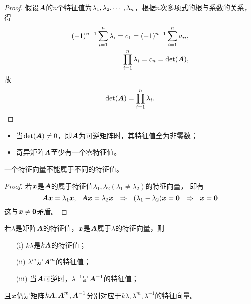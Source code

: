 \begin{frame}
\begin{proof}
  假设$\boldsymbol{A}$的$n$个特征值为$\lambda_1,\lambda_2,\cdots,\lambda_n$，根据$n$次多项式的根与系数的关系，得
  $$
  \begin{aligned}
    (-1)^{n-1}\sum_{i=1}^n\lambda_i = c_1 = (-1)^{n-1}\sum_{i=1}^na_{ii},\\
    \prod_{i=1}^n\lambda_i=c_n=\mathrm{det}(\boldsymbol{A}),
  \end{aligned}
  $$
  故
  $$
  \mathrm{det}(\boldsymbol{A})=\prod_{i=1}^n\lambda_i.
  $$
  
\end{proof}

\end{frame}

\begin{frame}[fragile]\ft{\subsecname}  

\begin{zhu*}
\begin{itemize}
\item 当$\mathrm{det}(\boldsymbol{A})\ne 0$，即$\boldsymbol{A}$为可逆矩阵时，其特征值全为非零数；
\item 奇异矩阵$\boldsymbol{A}$至少有一个零特征值。      
\end{itemize}
\end{zhu*}




\end{frame}

\begin{frame}[fragile]\ft{\subsecname}  

\begin{dingli}
  一个特征向量不能属于不同的特征值。
\end{dingli} \pause

\begin{proof}

  若${\boldsymbol{x}}$是$\boldsymbol{A}$的属于特征值$\lambda_1,\lambda_2(\lambda_1\ne\lambda_2)$的特征向量，
  即有
  $$
  \boldsymbol{A}{\boldsymbol{x}}=\lambda_1{\boldsymbol{x}}, ~~ \boldsymbol{A}{\boldsymbol{x}}=\lambda_2{\boldsymbol{x}}
  ~~\Rightarrow~~ (\lambda_1-\lambda_2){\boldsymbol{x}}=\boldsymbol{0}
  ~~\Rightarrow~~ {\boldsymbol{x}}=\boldsymbol{0}
  $$
  这与${\boldsymbol{x}}\ne\boldsymbol{0}$矛盾。
\end{proof}


\end{frame}

\begin{frame}[fragile]\ft{\subsecname}  



\begin{xingzhi}
  若$\lambda$是矩阵$\boldsymbol{A}$的特征值，${\boldsymbol{x}}$是$\boldsymbol{A}$属于$\lambda$的特征向量，则
  \begin{itemize}
  \item[(i)] $k\lambda$是$k\boldsymbol{A}$的特征值；
  \item[(ii)] $\lambda^m$是$\boldsymbol{A}^m$的特征值；
  \item[(iii)] 当$\boldsymbol{A}$可逆时，$\lambda^{-1}$是$\boldsymbol{A}^{-1}$的特征值；
  \end{itemize}
  且${\boldsymbol{x}}$仍是矩阵$k\boldsymbol{A},\boldsymbol{A}^m,\boldsymbol{A}^{-1}$分别对应于$k\lambda,\lambda^m,\lambda^{-1}$的特征向量。
\end{xingzhi}
\end{frame}

